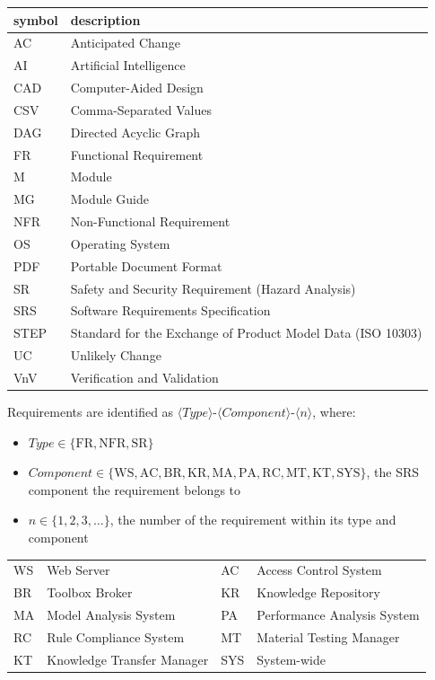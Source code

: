 \documentclass[12pt, titlepage]{article}
\begin{document}
\renewcommand{\arraystretch}{1.2}
\begin{tabular}{l l} 
  \toprule		
  \textbf{symbol} & \textbf{description}\\
  \midrule 
  AC & Anticipated Change\\
  AI & Artificial Intelligence\\
  CAD & Computer-Aided Design\\
  CSV & Comma-Separated Values\\
  DAG & Directed Acyclic Graph \\
  FR & Functional Requirement\\
  M & Module \\
  MG & Module Guide \\
  NFR & Non-Functional Requirement\\
  OS & Operating System \\
  PDF & Portable Document Format\\
  SR & Safety and Security Requirement (Hazard Analysis)\\
  SRS & Software Requirements Specification\\
  STEP & Standard for the Exchange of Product Model Data (ISO 10303)\\
  UC & Unlikely Change \\
  VnV & Verification and Validation\\
  \bottomrule
\end{tabular}

\vspace{1em}
\noindent Requirements are identified as $\langle \mathit{Type} \rangle$-$\langle \mathit{Component} \rangle$-$\langle n \rangle$, where:
\begin{itemize}
\item $\mathit{Type} \in \{\mathrm{FR}, \mathrm{NFR}, \mathrm{SR}\}$
\item $\mathit{Component} \in \{\mathrm{WS}, \mathrm{AC}, \mathrm{BR}, \mathrm{KR}, \mathrm{MA}, \mathrm{PA}, \mathrm{RC}, \mathrm{MT}, \mathrm{KT}, \mathrm{SYS}\}$, the SRS component the requirement belongs to
\item $n \in \{1, 2, 3, \ldots\}$, the number of the requirement within its type and component
\end{itemize}

\begin{tabular}{l l l l}
WS & Web Server & AC & Access Control System\\
BR & Toolbox Broker & KR & Knowledge Repository\\
MA & Model Analysis System & PA & Performance Analysis System\\
RC & Rule Compliance System & MT & Material Testing Manager\\
KT & Knowledge Transfer Manager & SYS & System-wide\\
\end{tabular}
\end{document}
